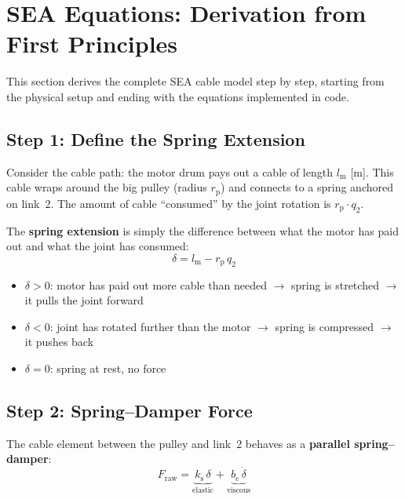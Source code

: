 \documentclass[11pt,a4paper]{article}
\newcommand{\rp}{r_{\mathrm{p}}}
\newcommand{\lm}{l_{\mathrm{m}}}
\newcommand{\ks}{k_{\mathrm{s}}}
\newcommand{\bc}{b_{\mathrm{c}}}
\begin{document}
\section{SEA Equations: Derivation from First Principles}
\label{sec:sea_derivation}

This section derives the complete SEA cable model step by step, starting from the physical setup and ending with the equations implemented in code.

\subsection{Step 1: Define the Spring Extension}

Consider the cable path: the motor drum pays out a cable of length $\lm$ [m].  This cable wraps around the big pulley (radius $\rp$) and connects to a spring anchored on link~2.  The amount of cable ``consumed'' by the joint rotation is $\rp \cdot q_2$.

The \textbf{spring extension} is simply the difference between what the motor has paid out and what the joint has consumed:
\begin{equation}
\boxed{\delta = \lm - \rp \, q_2}
\end{equation}

\begin{itemize}[leftmargin=2em]
    \item $\delta > 0$: motor has paid out more cable than needed $\to$ spring is stretched $\to$ it pulls the joint forward
    \item $\delta < 0$: joint has rotated further than the motor $\to$ spring is compressed $\to$ it pushes back
    \item $\delta = 0$: spring at rest, no force
\end{itemize}


\subsection{Step 2: Spring--Damper Force}

The cable element between the pulley and link~2 behaves as a \textbf{parallel spring--damper}:
\begin{equation}
\boxed{F_{\mathrm{raw}} = \underbrace{\ks \, \delta}_{\text{elastic}} + \underbrace{\bc \, \dot{\delta}}_{\text{viscous}}}
\end{equation}
\end{document}
